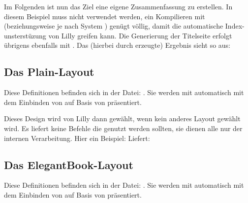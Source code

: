 %
%
%
%
%

\begin{bemerkung}
    Im Folgenden ist nun das Ziel eine eigene Zusammenfassung zu erstellen. In diesem Beispiel muss \Jake nicht verwendet werden, ein Kompilieren mit  (beziehungsweise je nach System ) genügt völlig, damit die automatische Index-unsterstüzung von Lilly greifen kann.
    Die Generierung der Titelseite erfolgt übrigens ebenfalls mit . Das (hierbei durch  erzeugte) Ergebnis sieht so aus:
    \begin{tcbraster}[raster columns=3, blankest,colback=white]
    \end{tcbraster}
\end{bemerkung}

%
%
%
%
%

\subsection{Das Plain-Layout}
Diese Definitionen befinden sich in der Datei: . Sie werden mit  automatisch mit dem Einbinden von  auf Basis von  präsentiert. \medskip\newline

Dieses Design wird von Lilly dann gewählt, wenn kein anderes Layout gewählt wird. Es liefert keine Befehle die genutzt werden sollten, sie dienen alle nur der internen Verarbeitung. Hier ein Beispiel:
Liefert:
\begin{tcbraster}[raster columns=3, blankest,colback=white]
\end{tcbraster}

%
%
%
%
%

\subsection{Das ElegantBook-Layout}
Diese Definitionen befinden sich in der Datei: . Sie werden mit  automatisch mit dem Einbinden von  auf Basis von  präsentiert.

